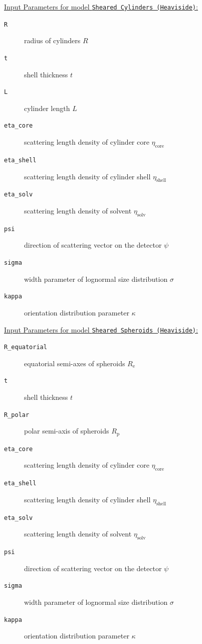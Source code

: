 \vspace{5mm}

\underline{Input Parameters for model \texttt{Sheared Cylinders (Heaviside)}:}\\
\begin{description}
\item[\texttt{R}] radius of cylinders $R$
\item[\texttt{t}] shell thickness $t$
\item[\texttt{L}] cylinder length $L$
\item[\texttt{eta\_core}] scattering length density of cylinder core $\eta_\mathrm{core}$
\item[\texttt{eta\_shell}] scattering length density of cylinder shell $\eta_\mathrm{shell}$
\item[\texttt{eta\_solv}] scattering length density of solvent $\eta_\mathrm{solv}$
\item[\texttt{psi}] direction of scattering vector on the detector $\psi$
\item[{\texttt{sigma}}] width parameter of lognormal size distribution $\sigma$
\item[{\texttt{kappa}}] orientation distribution parameter $\kappa$
\end{description}

\vspace{5mm}

\underline{Input Parameters for model \texttt{Sheared Spheroids (Heaviside)}:}\\
\begin{description}
\item[\texttt{R\_equatorial}] equatorial semi-axes of spheroids $R_\mathrm{e}$
\item[\texttt{t}] shell thickness $t$
\item[\texttt{R\_polar}] polar semi-axis of spheroids $R_\mathrm{p}$
\item[\texttt{eta\_core}] scattering length density of cylinder core $\eta_\mathrm{core}$
\item[\texttt{eta\_shell}] scattering length density of cylinder shell $\eta_\mathrm{shell}$
\item[\texttt{eta\_solv}] scattering length density of solvent $\eta_\mathrm{solv}$
\item[\texttt{psi}] direction of scattering vector on the detector $\psi$
\item[{\texttt{sigma}}] width parameter of lognormal size distribution $\sigma$
\item[{\texttt{kappa}}] orientation distribution parameter $\kappa$
\end{description}

